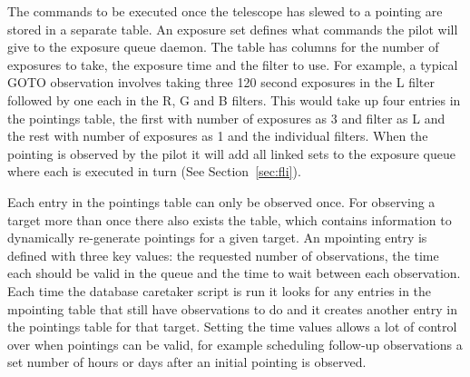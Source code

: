 \begin{colsection}
\begin{colsection}
The commands to be executed once the telescope has slewed to a pointing are stored in a separate  table. An exposure set defines what commands the pilot will give to the exposure queue daemon. The table has columns for the number of exposures to take, the exposure time and the filter to use. For example, a typical GOTO observation involves taking three 120 second exposures in the L filter followed by one each in the R, G and B filters. This would take up four entries in the pointings table, the first with number of exposures as 3 and filter as L and the rest with number of exposures as 1 and the individual filters. When the pointing is observed by the pilot it will add all linked sets to the exposure queue where each is executed in turn (See Section~\ref{sec:fli}).

Each entry in the pointings table can only be observed once. For observing a target more than once there also exists the  table, which contains information to dynamically re-generate pointings for a given target. An mpointing entry is defined with three key values: the requested number of observations, the time each should be valid in the queue and the time to wait between each observation. Each time the database caretaker script is run it looks for any entries in the mpointing table that still have observations to do and it creates another entry in the pointings table for that target. Setting the time values allows a lot of control over when pointings can be valid, for example scheduling follow-up observations a set number of hours or days after an initial pointing is observed.


\end{colsection}
\end{colsection}
